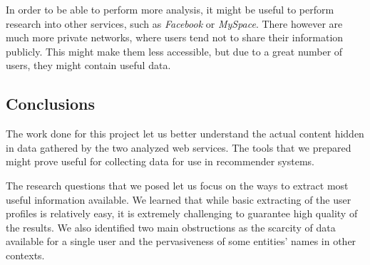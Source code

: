 In order to be able to perform more analysis, it might be useful to perform
research into other services, such as \textit{Facebook} or \textit{MySpace}.
There however are much more private networks, where users tend not to share
their information publicly. This might make them less accessible, but due to a
great number of users, they might contain useful data.

\subsection{Conclusions}

The work done for this project let us better understand the actual content
hidden in data gathered by the two analyzed web services. The tools that we
prepared might prove useful for collecting data for use in recommender systems.

The research questions that we posed let us focus on the ways to extract most
useful information available. We learned that while basic extracting of the
user profiles is relatively easy, it is extremely challenging to guarantee high
quality of the results. We also identified two main obstructions as the
scarcity of data available for a single user and the pervasiveness of some
entities' names in other contexts.
